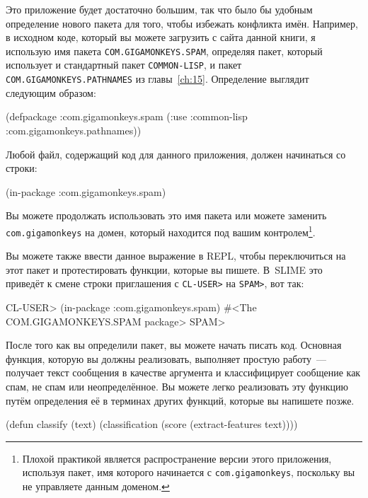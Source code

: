Это приложение будет достаточно большим, так что было бы удобным определение нового пакета
для того, чтобы избежать конфликта имён.  Например, в исходном коде, который вы можете
загрузить с сайта данной книги, я использую имя пакета \lstinline{COM.GIGAMONKEYS.SPAM},
определяя пакет, который использует и стандартный пакет \lstinline{COMMON-LISP}, и пакет
\lstinline{COM.GIGAMONKEYS.PATHNAMES} из главы~\ref{ch:15}.  Определение выглядит сле\-дую\-щим
образом:

\begin{myverb}
(defpackage :com.gigamonkeys.spam
  (:use :common-lisp :com.gigamonkeys.pathnames))
\end{myverb}

Любой файл, содержащий код для данного приложения, должен начинаться со строки:

\begin{myverb}
(in-package :com.gigamonkeys.spam)
\end{myverb}

Вы можете продолжать использовать это имя пакета или можете заменить
\lstinline{com.gigamonkeys} на домен, который находится под вашим контролем\footnote{Плохой
  практикой является распространение версии этого приложения, используя пакет, имя
  которого начинается с \lstinline{com.gigamonkeys}, поскольку вы не управляете данным
  доменом.}\hspace{\footnotenegspace}.

Вы можете также ввести данное выражение в REPL, чтобы переключиться на этот пакет и
протестировать функции, которые вы пишете.  В~SLIME это приведёт к смене строки
приглашения с \lstinline{CL-USER>} на \lstinline{SPAM>}, вот так:

\begin{myverb}
CL-USER> (in-package :com.gigamonkeys.spam)
#<The COM.GIGAMONKEYS.SPAM package>
SPAM> 
\end{myverb}

После того как вы определили пакет, вы можете начать писать код.  Основная функция,
которую вы должны реализовать, выполняет простую работу~--- получает текст сообщения в
качестве аргумента и классифицирует сообщение как спам, не спам или неопределённое.  Вы
можете легко реализовать эту функцию путём определения её в терминах других функций,
которые вы напишете позже.

\begin{myverb}
(defun classify (text)
  (classification (score (extract-features text))))
\end{myverb}

